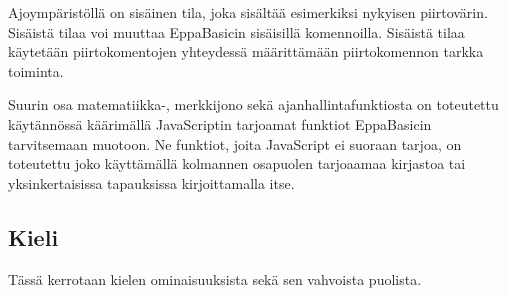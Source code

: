 Ajoympäristöllä on sisäinen tila,
joka sisältää esimerkiksi nykyisen piirtovärin.
Sisäistä tilaa voi muuttaa EppaBasicin sisäisillä komennoilla.
Sisäistä tilaa käytetään piirtokomentojen yhteydessä määrittämään
piirtokomennon tarkka toiminta.

Suurin osa matematiikka-, merkkijono sekä ajanhallintafunktiosta on toteutettu käytännössä
käärimällä JavaScriptin tarjoamat funktiot EppaBasicin tarvitsemaan muotoon.
Ne funktiot, joita JavaScript ei suoraan tarjoa, on toteutettu
joko käyttämällä kolmannen osapuolen tarjoaamaa kirjastoa
tai yksinkertaisissa tapauksissa kirjoittamalla itse.

\subsection{Kieli}
\begin{anfxnote}{}
Tässä kerrotaan kielen ominaisuuksista
sekä sen vahvoista puolista.
\end{anfxnote}

